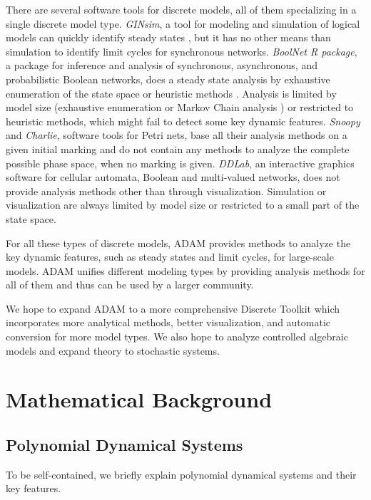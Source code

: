 \documentclass[11pt]{amsart}
\begin{document}
There are  several software tools for discrete models, all of them specializing in a single discrete model type.
{\it GINsim}, a tool for modeling and simulation of logical models can quickly identify steady states \cite{GINsim}, but it has no other means than simulation to identify limit cycles for synchronous networks. {\it BoolNet R package}, a package for inference and analysis of synchronous, asynchronous, and probabilistic Boolean networks, does a steady state analysis by exhaustive enumeration of the state space or heuristic methods \cite{boolnet}. Analysis is limited by model size (exhaustive enumeration or Markov Chain analysis ) or restricted to heuristic methods, which might fail to detect some key dynamic features.
{\it Snoopy} and {\it Charlie}, software tools for Petri nets, base all their analysis methods on a given initial marking and do not contain any methods to analyze the complete possible phase space, when no marking is given. {\it DDLab}, an interactive graphics software for cellular automata, Boolean and multi-valued networks, does not provide analysis methods other than through visualization. Simulation or visualization are always limited by model size or restricted to a small part of the state space.

For all these types of discrete models, ADAM provides methods to analyze the key dynamic features, such as steady states and limit cycles, for large-scale models. ADAM unifies different modeling types by providing analysis methods for all of them and thus can be used by a larger community.

We hope to expand ADAM to a more comprehensive Discrete Toolkit which incorporates more
analytical methods, better visualization, and automatic conversion for more model types.
We also hope to analyze controlled algebraic models and expand theory to stochastic systems.


\appendix
\section{Mathematical Background}
\subsection{Polynomial Dynamical Systems}
To be self-contained, we briefly explain polynomial dynamical systems and their key features.
\end{document}
